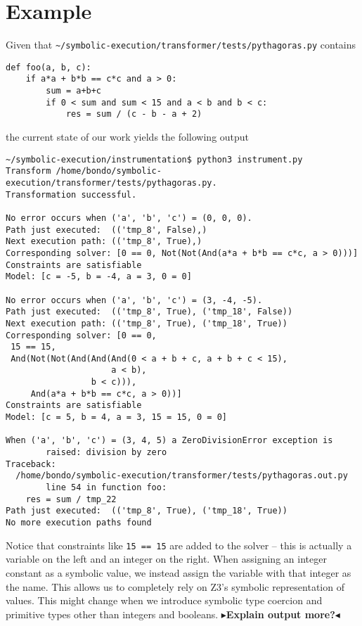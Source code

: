 \documentclass[11pt]{report}
\newcommand{\todo}[1]{{\color[rgb]{.5,0,0}\textbf{$\blacktriangleright$#1$\blacktriangleleft$}}}
\begin{document}
\section{Example}

Given that \verb|~/symbolic-execution/transformer/tests/pythagoras.py| contains
\begin{verbatim}
def foo(a, b, c):
    if a*a + b*b == c*c and a > 0:
        sum = a+b+c
        if 0 < sum and sum < 15 and a < b and b < c:
            res = sum / (c - b - a + 2)
\end{verbatim}

the current state of our work yields the following output

\begin{verbatim}
~/symbolic-execution/instrumentation$ python3 instrument.py
Transform /home/bondo/symbolic-execution/transformer/tests/pythagoras.py.
Transformation successful.

No error occurs when ('a', 'b', 'c') = (0, 0, 0).
Path just executed:  (('tmp_8', False),)
Next execution path: (('tmp_8', True),)
Corresponding solver: [0 == 0, Not(Not(And(a*a + b*b == c*c, a > 0)))]
Constraints are satisfiable
Model: [c = -5, b = -4, a = 3, 0 = 0] 

No error occurs when ('a', 'b', 'c') = (3, -4, -5).
Path just executed:  (('tmp_8', True), ('tmp_18', False))
Next execution path: (('tmp_8', True), ('tmp_18', True))
Corresponding solver: [0 == 0,
 15 == 15,
 And(Not(Not(And(And(And(0 < a + b + c, a + b + c < 15),
                     a < b),
                 b < c))),
     And(a*a + b*b == c*c, a > 0))]
Constraints are satisfiable
Model: [c = 5, b = 4, a = 3, 15 = 15, 0 = 0] 

When ('a', 'b', 'c') = (3, 4, 5) a ZeroDivisionError exception is
        raised: division by zero
Traceback:
  /home/bondo/symbolic-execution/transformer/tests/pythagoras.out.py
        line 54 in function foo:
    res = sum / tmp_22
Path just executed:  (('tmp_8', True), ('tmp_18', True))
No more execution paths found
\end{verbatim}

Notice that constraints like \verb|15 == 15| are added to the solver
-- this is actually a variable on the left and an integer on the
right. When assigning an integer constant as a symbolic value, we
instead assign the variable with that integer as the name. This allows
us to completely rely on Z3's symbolic representation of values. This
might change when we introduce symbolic type coercion and primitive
types other than integers and booleans. \todo{Explain output more?}
\end{document}
